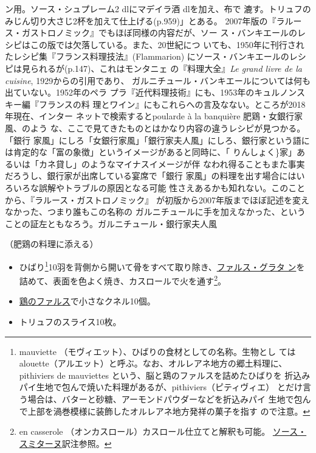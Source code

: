 \begin{recette}
{{{{  ン用。ソース・シュプレーム2 dlにマデイラ酒\undemi{} dlを加え、布で
  漉す。トリュフのみじん切り大さじ2杯を加えて仕上げる(p.959)」とある。
  2007年版の『ラルース・ガストロノミック』でもほぼ同様の内容だが、ソー
  ス・バンキエールのレシピはこの版では欠落している。また、20世紀につ
  いても、1950年に刊行されたレシピ集『フランス料理技法』(Flammarion)
  にソース・バンキエールのレシピは見られるが(p.147)、これはモンタニェ
  の『料理大全』\emph{Le grand livre de la cuisine},
  1929からの引用であり、
  ガルニチュール・バンキエールについては何も出ていない。1952年のペラ
  プラ『近代料理技術』にも、1953年のキュルノンスキー編『フランスの料
  理とワイン』にもこれらへの言及なない。ところが2018年現在、インター
  ネットで検索するとpoularde à la banquière 肥鶏・女銀行家風、のよう
  な、ここで見てきたものとはかなり内容の違うレシピが見つかる。「銀行
  家風」にしろ「女銀行家風」「銀行家夫人風」にしろ、銀行家という語に
  は肯定的な「富の象徴」というイメージがあると同時に、「
  {りんしょく}\}家」あるいは「カネ貸し」のようなマイナスイメージが伴
  なわれ得ることもまた事実だろうし、銀行家が出席している宴席で「銀行
  家風」の料理を出す場合にはいろいろな誤解やトラブルの原因となる可能
  性さえあるかも知れない。このことから、『ラルース・ガストロノミック』
  が初版から2007年版までほぼ記述を変えなかった、つまり誰もこの名称の
  ガルニチュールに手を加えなかった、ということの証左ともなろう。}}{ガルニチュール・銀行家夫人風}}\label{garniture-banquiere}}



（肥鶏の料理に添える）

\begin{itemize}
\item
  ひばり\footnote{mauviette
    （モヴィエット）、ひばりの食材としての名称。生物とし
    てはalouette（アルエット）と呼ぶ。なお、オルレアネ地方の郷土料理に、
    pithiviers de mauviettes という、脳と鶏のファルスを詰めたひばりを
    折込みパイ生地で包んで焼いた料理があるが、pithiviers（ピティヴィエ）
    とだけ言う場合は、バターと砂糖、アーモンドパウダーなどを折込みパイ
    生地で包んで上部を渦巻模様に装飾したオルレアネ地方発祥の菓子を指す
    ので注意。}10羽を背側から開いて骨をすべて取り除き、\protect\hyperlink{farce-gratin-c}{ファルス・グラタ
  ン}を詰めて、表面を色よく焼き、カスロールで火を通す\footnote{en
    casserole （オンカスロール）カスロール仕立てと解釈も可能。
    \protect\hyperlink{sauce-smitane}{ソース・スミターヌ}訳注参照。}。
\item
  \protect\hyperlink{farce-b}{鶏のファルス}で小さなクネル10個。
\item
  トリュフのスライス10枚。
\end{itemize}


\end{recette}
